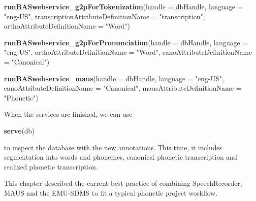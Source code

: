\documentclass[]{book}
\newenvironment{Shaded}{\begin{snugshade}}{\end{snugshade}}
\newcommand{\KeywordTok}[1]{\textcolor[rgb]{0.13,0.29,0.53}{\textbf{{#1}}}}
\newcommand{\DataTypeTok}[1]{\textcolor[rgb]{0.13,0.29,0.53}{{#1}}}
\newcommand{\StringTok}[1]{\textcolor[rgb]{0.31,0.60,0.02}{{#1}}}
\newcommand{\NormalTok}[1]{{#1}}
\theoremstyle{definition}
\theoremstyle{definition}
\theoremstyle{definition}
\theoremstyle{remark}
\begin{document}
\begin{Shaded}
\begin{Highlighting}[]
\KeywordTok{runBASwebservice_g2pForTokenization}\NormalTok{(}\DataTypeTok{handle =} \NormalTok{dbHandle,}
                                    \DataTypeTok{language =} \StringTok{"eng-US"}\NormalTok{,}
                                    \DataTypeTok{transcriptionAttributeDefinitionName =} \StringTok{"transcription"}\NormalTok{,}
                                    \DataTypeTok{orthoAttributeDefinitionName =} \StringTok{"Word"}\NormalTok{)}

\KeywordTok{runBASwebservice_g2pForPronunciation}\NormalTok{(}\DataTypeTok{handle =} \NormalTok{dbHandle,}
                                     \DataTypeTok{language =} \StringTok{"eng-US"}\NormalTok{,}
                                     \DataTypeTok{orthoAttributeDefinitionName =} \StringTok{"Word"}\NormalTok{,}
                                     \DataTypeTok{canoAttributeDefinitionName =} \StringTok{"Canonical"}\NormalTok{)}

\KeywordTok{runBASwebservice_maus}\NormalTok{(}\DataTypeTok{handle =} \NormalTok{dbHandle,}
                      \DataTypeTok{language =} \StringTok{"eng-US"}\NormalTok{,}
                      \DataTypeTok{canoAttributeDefinitionName =} \StringTok{"Canonical"}\NormalTok{,}
                      \DataTypeTok{mausAttributeDefinitionName =} \StringTok{"Phonetic"}\NormalTok{)}
\end{Highlighting}
\end{Shaded}

When the services are finished, we can use

\begin{Shaded}
\begin{Highlighting}[]
\KeywordTok{serve}\NormalTok{(db)}
\end{Highlighting}
\end{Shaded}

to inspect the database with the new annotations. This time, it includes
segmentation into words and phonemes, canonical phonetic transcription
and realized phonetic transcription.

This chapter described the current best practice of combining
SpeechRecorder, MAUS and the EMU-SDMS to fit a typical phonetic project
workflow.


\end{document}
